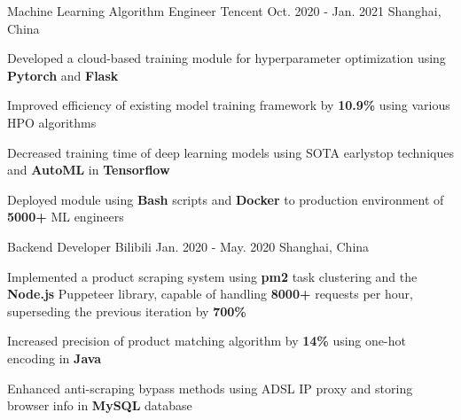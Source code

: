 

\begin{cventries}

  \cventry
    {Machine Learning Algorithm Engineer} %
    {Tencent} %
    {Oct. 2020 - Jan. 2021} %
    {Shanghai, China} %
    {
      \begin{cvitems} %
        \item Developed a cloud-based training module for hyperparameter optimization using \textbf{Pytorch} and \textbf{Flask}
        \item Improved efficiency of existing model training framework by \textbf{10.9\%} using various HPO algorithms
        \item Decreased training time of deep learning models using SOTA earlystop techniques and \textbf{AutoML} in \textbf{Tensorflow}
        \item Deployed module using \textbf{Bash} scripts and \textbf{Docker} to production environment of \textbf{5000+} ML engineers
      \end{cvitems}
    }

  \cventry
    {Backend Developer} %
    {Bilibili} %
    {Jan. 2020 - May. 2020} %
    {Shanghai, China} %
    {
      \begin{cvitems} %
        \item Implemented a product scraping system using \textbf{pm2} task clustering and the \textbf{Node.js} Puppeteer library, capable of handling \textbf{8000+} requests per hour, superseding the previous iteration by \textbf{700\%}
        \item Increased precision of product matching algorithm by \textbf{14\%} using one-hot encoding in \textbf{Java}
        \item Enhanced anti-scraping bypass methods using ADSL IP proxy and storing browser info in \textbf{MySQL} database
      \end{cvitems}
    }


\end{cventries}
